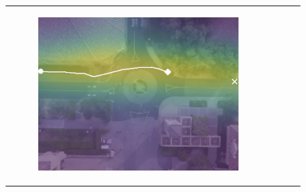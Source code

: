 \documentclass[letterpaper,10pt,conference]{ieeeconf}
\begin{document}
\begin{figure}
\begin{tabular}{M{.1\linewidth}  M{.3\linewidth} M{.3\linewidth}  M{.3\linewidth}}
	\begin{subfigure}[b]{\linewidth}
		\includegraphics[width=\linewidth]{./figures/comparison/ours_death_1_2_t=370.png}
	\end{subfigure} \\
	

\end{tabular}
\end{figure}
\end{document}
